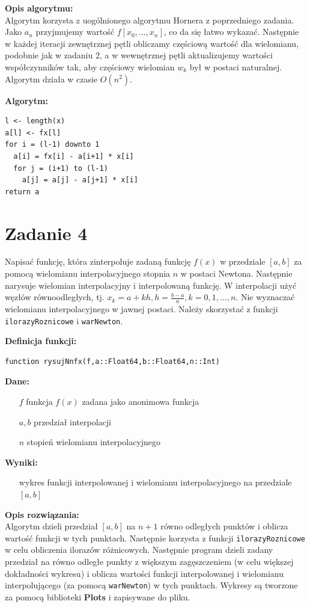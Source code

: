 \documentclass[12pt]{article}
\begin{document}
\noindent \textbf{Opis algorytmu:}\\
Algorytm korzysta z uogólnionego algorytmu Hornera z poprzedniego zadania. Jako $a_n$ przyjmujemy wartość $f[x_0, \ldots, x_n]$, co da się łatwo wykazać. Następnie w każdej iteracji zewnętrznej pętli obliczamy częściową wartość dla wielomianu, podobnie jak w zadaniu 2, a w wewnętrznej pętli aktualizujemy wartości współczynników tak, aby częściowy wielomian $w_k$ był w postaci naturalnej. Algorytm działa w czasie $O(n^2)$.

\noindent \textbf{Algorytm:}
\begin{verbatim}
l <- length(x)
a[l] <- fx[l]
for i = (l-1) downto 1
  a[i] = fx[i] - a[i+1] * x[i]
  for j = (i+1) to (l-1)
    a[j] = a[j] - a[j+1] * x[i]
return a
\end{verbatim}

\section{Zadanie 4}
Napisać funkcję, która zinterpoluje zadaną funkcję $f(x)$ w przedziale $[a, b]$ za pomocą wielomianu interpolacyjnego stopnia $n$ w postaci Newtona. Następnie narysuje wielomian interpolacyjny i interpolowaną funkcję. W interpolacji użyć węzłów równoodległych, tj. $x_k=a+kh, h=\frac{b-a}{n}, k= 0,1, \ldots , n$. Nie wyznaczać wielomianu interpolacyjnego w jawnej postaci. Należy skorzystać z funkcji \texttt{ilorazyRoznicowe} i \texttt{warNewton}.


\noindent \textbf{Definicja funkcji:}

\begin{verbatim}
function rysujNnfx(f,a::Float64,b::Float64,n::Int)
\end{verbatim}

\noindent \textbf{Dane:}
\begin{itemize}[leftmargin=4.0cm,labelsep=0.4cm]
\item[$f$] funkcja $f(x)$ zadana jako anonimowa funkcja
\item[$a, b$]  przedział interpolacji
\item[$n$] stopień wielomianu interpolacyjnego
\end{itemize}
\textbf{Wyniki:} 
\begin{itemize}[leftmargin=4.0cm,labelsep=0.4cm]
\item[] wykres funkcji interpolowanej i wielomianu interpolacyjnego na przedziale $[a,b]$
\end{itemize}


\noindent \textbf{Opis rozwiązania:}\\
Algorytm dzieli przedział $[a,b]$ na $n+1$ równo odległych punktów i oblicza wartość funkcji w tych punktach. Następnie korzysta z funkcji \texttt{ilorazyRoznicowe} w celu obliczenia ilorazów różnicowych. Następnie program dzieli zadany przedział na równo odległe punkty z większym zagęszczeniem (w celu większej dokładności wykresu) i oblicza wartości funkcji interpolowanej i wielomianu interpolującego (za pomocą \texttt{warNewton}) w tych punktach. Wykresy są tworzone za pomocą biblioteki \textbf{Plots} i zapisywane do pliku.
\end{document}
